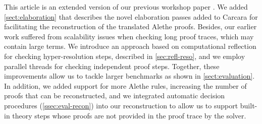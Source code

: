 This article is an extended version of our previous workshop paper \cite{ColtellacciMD24}. We added \cref{sect:elaboration} that describes the novel elaboration passes added to Carcara for facilitating the reconstruction of the translated Alethe proofs. Besides, our earlier work suffered from scalability issues when checking long proof traces, which may contain large terms. We introduce an approach based on computational reflection for checking hyper-resolution steps, described in \cref{sec:refl-reso}, and we employ parallel threads for checking independent proof steps. Together, these improvements allow us to tackle larger benchmarks as shown in \cref{sect:evaluation}.
In addition, we added support for more Alethe rules, increasing the number of proofs that can be reconstructed, and we integrated automatic decision procedures (\cref{ssec:eval-recon}) into our reconstruction to allow us to support built-in theory steps whose proofs are not provided in the proof trace by the solver.
